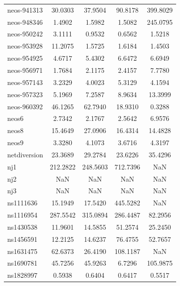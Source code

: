 \begin{longtable}{lcccc}
neos-941313                 &   30.0303 &  37.9504 &   90.8178 &  399.8029 \\
neos-948346                 &    1.4902 &   1.5982 &    1.5082 &  245.0795 \\
neos-950242                 &    3.1111 &   0.9532 &    0.6562 &    1.5218 \\
neos-953928                 &   11.2075 &   1.5725 &    1.6184 &    1.4503 \\
neos-954925                 &    4.6717 &   5.4302 &    6.6472 &    6.6949 \\
neos-956971                 &    1.7684 &   2.1175 &    2.4157 &    7.7780 \\
neos-957143                 &    3.2329 &   4.0023 &    5.3129 &    4.1594 \\
neos-957323                 &    5.1969 &   7.2587 &    8.9634 &   13.3999 \\
neos-960392                 &   46.1265 &  62.7940 &   18.9310 &    0.3288 \\
neos6                       &    2.7342 &   2.1767 &    2.5642 &    6.9576 \\
neos8                       &   15.4649 &  27.0906 &   16.4314 &   14.4828 \\
neos9                       &    3.3280 &   4.1073 &    3.6716 &    4.3197 \\
netdiversion                &   23.3689 &  29.2784 &   23.6226 &   35.4296 \\
nj1                         &  212.2822 & 248.5603 &  712.7396 &       NaN \\
nj2                         &       NaN &      NaN &       NaN &       NaN \\
nj3                         &       NaN &      NaN &       NaN &       NaN \\
ns1111636                   &   15.1949 &  17.5420 &  445.5282 &       NaN \\
ns1116954                   &  287.5542 & 315.0894 &  286.4487 &   82.2956 \\
ns1430538                   &   11.9601 &  14.5855 &   51.2574 &   25.2450 \\
ns1456591                   &   12.2125 &  14.6237 &   76.4755 &   52.7657 \\
ns1631475                   &   62.6373 &  26.4190 &  108.1187 &       NaN \\
ns1690781                   &   45.7256 &  45.9263 &    6.7296 &  105.9875 \\
ns1828997                   &    0.5938 &   0.6404 &    0.6417 &    0.5517 \\

\end{longtable}
